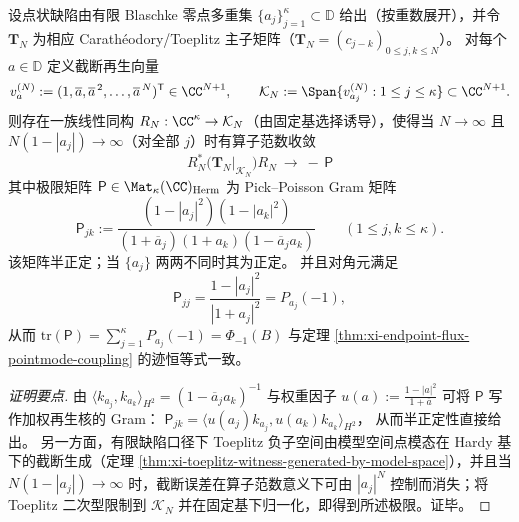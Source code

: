 \begin{proposition}\label{prop:xi-toeplitz-negative-spectrum-pick-poisson-gram}
设点状缺陷由有限 Blaschke 零点多重集 \(\{a_j\}_{j=1}^{\kappa}\subset\mathbb{D}\) 给出（按重数展开），并令 \(\mathbf{T}_N\) 为相应 Carath\'eodory/Toeplitz 主子矩阵（\(\mathbf{T}_N=(c_{j-k})_{0\le j,k\le N}\)）。
对每个 \(a\in\mathbb{D}\) 定义截断再生向量
\[
v_a^{(N)}:=(1,\overline a,\overline a^{\,2},\dots,\overline a^{\,N})^{\mathsf T}\in\CC^{N+1},
\qquad
\mathcal{K}_N:=\Span\{v_{a_j}^{(N)}:1\le j\le\kappa\}\subset\CC^{N+1}.
\]
则存在一族线性同构 \(R_N:\CC^\kappa\to\mathcal{K}_N\)（由固定基选择诱导），使得当 \(N\to\infty\) 且 \(N(1-|a_j|)\to\infty\)（对全部 \(j\)）时有算子范数收敛
\[
\boxed{\;
R_N^\ast\bigl(\mathbf{T}_N|_{\mathcal{K}_N}\bigr)R_N\ \longrightarrow\ -\,\mathsf{P}\;}
\]
其中极限矩阵 \(\mathsf{P}\in\Mat_{\kappa}(\CC)_{\mathrm{Herm}}\) 为 Pick--Poisson Gram 矩阵
\begin{equation}\label{eq:xi-pick-poisson-gram}
\boxed{\;
\mathsf{P}_{jk}
:=
\frac{(1-|a_j|^2)(1-|a_k|^2)}{(1+\overline a_j)(1+a_k)(1-\overline a_j a_k)}
\qquad(1\le j,k\le\kappa).\;}
\end{equation}
该矩阵半正定；当 \(\{a_j\}\) 两两不同时其为正定。
并且对角元满足
\[
\mathsf{P}_{jj}=\frac{1-|a_j|^2}{|1+a_j|^2}=P_{a_j}(-1),
\]
从而 \(\mathrm{tr}(\mathsf{P})=\sum_{j=1}^{\kappa}P_{a_j}(-1)=\Phi_{-1}(B)\) 与定理 \ref{thm:xi-endpoint-flux-pointmode-coupling} 的迹恒等式一致。
\end{proposition}
\begin{proof}[证明要点]
由 \(\langle k_{a_j},k_{a_k}\rangle_{H^2}=(1-\overline a_j a_k)^{-1}\) 与权重因子
\(
u(a):=\frac{1-|a|^2}{1+\overline a}
\)
可将 \(\mathsf P\) 写作加权再生核的 Gram：
\(
\mathsf P_{jk}=\langle u(a_j)k_{a_j},u(a_k)k_{a_k}\rangle_{H^2}
\)，
从而半正定性直接给出。
另一方面，有限缺陷口径下 Toeplitz 负子空间由模型空间点模态在 Hardy 基下的截断生成（定理 \ref{thm:xi-toeplitz-witness-generated-by-model-space}），并且当 \(N(1-|a_j|)\to\infty\) 时，截断误差在算子范数意义下可由 \(|a_j|^{N}\) 控制而消失；将 Toeplitz 二次型限制到 \(\mathcal K_N\) 并在固定基下归一化，即得到所述极限。证毕。
\end{proof}

